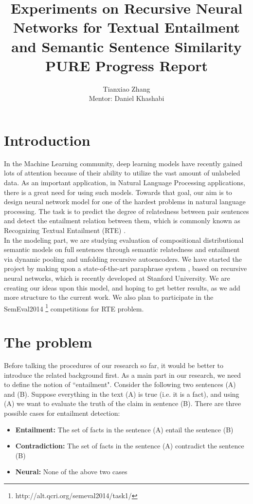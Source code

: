 \documentclass[12pt]{article}
\title{Experiments on Recursive Neural Networks for Textual Entailment and Semantic Sentence Similarity \\ PURE Progress Report }
\author{Tianxiao Zhang \\ Mentor: Daniel Khashabi  }
\begin{document}

\maketitle

\section{Introduction}
 In the Machine Learning community, deep learning models have recently gained lots of attention because of their ability to utilize the vast amount of unlabeled data. As an important application, in Natural Language Processing applications, there is a great need for using such models. Towards that goal, our aim is to design neural network model for one of the hardest problems in natural language processing. The task is to predict the degree of relatedness between pair sentences and detect the entailment relation between them, which is commonly known as Recognizing Textual Entailment (RTE) \cite{dagan2010recognizing}.  \\
  

In the modeling part, we are studying evaluation of compositional distributional semantic models on full sentences through semantic relatedness and entailment via dynamic pooling and unfolding recursive autoencoders. We have started the project by making upon a state-of-the-art paraphrase system \cite{socher2011dynamic}, based on recursive neural networks, which is recently developed at Stanford University. We are creating our ideas upon this model, and hoping to get better results, as we add more structure to the current work. We also plan to participate in the SemEval2014 \footnote{http://alt.qcri.org/semeval2014/task1/} competitions for RTE problem. 

\section{The problem}
Before talking the procedures of our research so far, it would be better to introduce the related background first. As a main part in our research, we need to define the notion of ``entailment". Consider the following two sentences (A) and (B). Suppose everything in the text (A) is true (i.e. it is a fact), and using (A) we want to evaluate the truth of the claim in sentence (B). There are three possible cases for entailment detection:
\begin{itemize}
\item \textbf{Entailment:} The set of facts in the sentence (A) entail the sentence (B)
\item \textbf{Contradiction:} The set of facts in the sentence (A) contradict the sentence (B)
\item \textbf{Neural:} None of the above two cases

\end{itemize}
\end{document}
